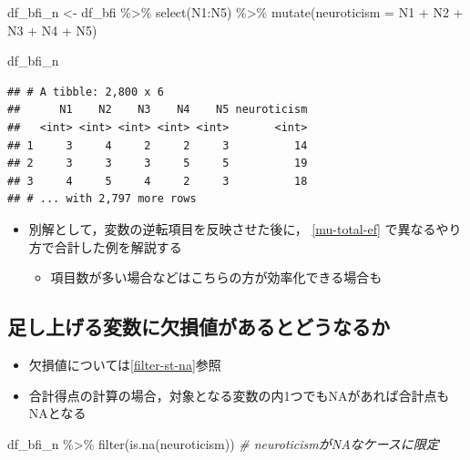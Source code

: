 \documentclass[
  xelatex,ja=standard, b5paper]{bxjsbook}
\newenvironment{Shaded}{\begin{snugshade}}{\end{snugshade}}
\newcommand{\AttributeTok}[1]{\textcolor[rgb]{0.77,0.63,0.00}{#1}}
\newcommand{\CommentTok}[1]{\textcolor[rgb]{0.56,0.35,0.01}{\textit{#1}}}
\newcommand{\FunctionTok}[1]{\textcolor[rgb]{0.00,0.00,0.00}{#1}}
\newcommand{\NormalTok}[1]{#1}
\newcommand{\OtherTok}[1]{\textcolor[rgb]{0.56,0.35,0.01}{#1}}
\newcommand{\SpecialCharTok}[1]{\textcolor[rgb]{0.00,0.00,0.00}{#1}}
\providecommand{\tightlist}{%
  \setlength{\itemsep}{0pt}\setlength{\parskip}{0pt}}
\begin{document}
\begin{Shaded}
\begin{Highlighting}[]
\NormalTok{df\_bfi\_n }\OtherTok{\textless{}{-}} 
\NormalTok{  df\_bfi }\SpecialCharTok{\%\textgreater{}\%}
  \FunctionTok{select}\NormalTok{(N1}\SpecialCharTok{:}\NormalTok{N5) }\SpecialCharTok{\%\textgreater{}\%}                       
  \FunctionTok{mutate}\NormalTok{(}\AttributeTok{neuroticism =}\NormalTok{ N1 }\SpecialCharTok{+}\NormalTok{ N2 }\SpecialCharTok{+}\NormalTok{ N3 }\SpecialCharTok{+}\NormalTok{ N4 }\SpecialCharTok{+}\NormalTok{ N5)}
  
\NormalTok{df\_bfi\_n}
\end{Highlighting}
\end{Shaded}

\begin{verbatim}
## # A tibble: 2,800 x 6
##      N1    N2    N3    N4    N5 neuroticism
##   <int> <int> <int> <int> <int>       <int>
## 1     3     4     2     2     3          14
## 2     3     3     3     5     5          19
## 3     4     5     4     2     3          18
## # ... with 2,797 more rows
\end{verbatim}

\begin{itemize}
\tightlist
\item
  別解として，変数の逆転項目を反映させた後に， \ref{mu-total-ef} で異なるやり方で合計した例を解説する

  \begin{itemize}
  \tightlist
  \item
    項目数が多い場合などはこちらの方が効率化できる場合も
  \end{itemize}
\end{itemize}

\hypertarget{mu-total-na}{%
\subsection{足し上げる変数に欠損値があるとどうなるか}\label{mu-total-na}}

\begin{itemize}
\tightlist
\item
  欠損値については\ref{filter-st-na}参照
\item
  合計得点の計算の場合，対象となる変数の内1つでもNAがあれば合計点もNAとなる
\end{itemize}

\begin{Shaded}
\begin{Highlighting}[]
\NormalTok{df\_bfi\_n }\SpecialCharTok{\%\textgreater{}\%} 
  \FunctionTok{filter}\NormalTok{(}\FunctionTok{is.na}\NormalTok{(neuroticism))     }\CommentTok{\# neuroticismがNAなケースに限定}
\end{Highlighting}
\end{Shaded}
\end{document}
